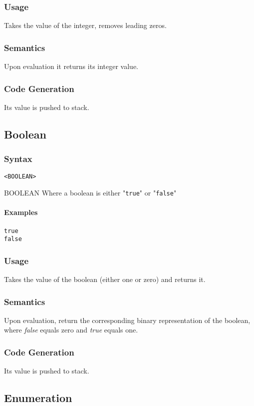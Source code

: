 \documentclass[twoside]{report}
\newenvironment{mycompactdesc}{\begin{adjustwidth}{0.53cm}{}\begin{compactdesc}}{\end{compactdesc}\end{adjustwidth}}
\begin{document}
\subsubsection*{Usage}
Takes the value of the integer, removes leading zeros.
\subsubsection*{Semantics}
Upon evaluation it returns its integer value.
\subsubsection*{Code Generation}
Its value is pushed to stack.


\subsection{Boolean}
\label{def:boolean}
\subsubsection*{Syntax}
\texttt{<BOOLEAN>}
\begin{mycompactdesc}
	\item[BOOLEAN] Where a boolean is either "\texttt{true}" or "\texttt{false}"
\end{mycompactdesc}
\paragraph{Examples}
\begin{verbatim}
true
false
\end{verbatim}
\subsubsection*{Usage}
Takes the value of the boolean (either one or zero) and returns it.
\subsubsection*{Semantics}
Upon evaluation, return the corresponding binary representation of the boolean, where \emph{false} equals zero and \emph{true} equals one.
\subsubsection*{Code Generation}
Its value is pushed to stack.

\subsection{Enumeration}
\label{def:statenum}
\end{document}
